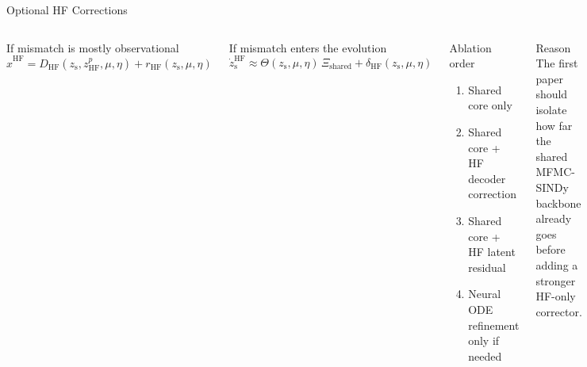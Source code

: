 \documentclass[aspectratio=169]{beamer}
\newcommand{\zs}{z_{\mathrm{s}}}
\newcommand{\thetamat}{\Theta(\zs,\mu,\eta)}
\begin{document}
\begin{frame}{Optional HF Corrections}
\begin{columns}[T]
\begin{block}{If mismatch is mostly observational}
\[
\hat x^{\mathrm{HF}}
=
D_{\mathrm{HF}}(\zs, z_{\mathrm{HF}}^p, \mu, \eta)
+
r_{\mathrm{HF}}(\zs,\mu,\eta)
\]
\end{block}

\begin{block}{If mismatch enters the evolution}
\[
\dot \zs^{\mathrm{HF}}
\approx
\thetamat \, \Xi_{\mathrm{shared}}
+
\delta_{\mathrm{HF}}(\zs,\mu,\eta)
\]
\end{block}

\begin{block}{Ablation order}
\begin{enumerate}
\item Shared core only
\item Shared core + HF decoder correction
\item Shared core + HF latent residual
\item Neural ODE refinement only if needed
\end{enumerate}
\end{block}

\begin{alertblock}{Reason}
The first paper should isolate how far the shared MFMC-SINDy backbone already goes before adding a stronger HF-only corrector.
\end{alertblock}
\end{columns}
\end{frame}
\end{document}
